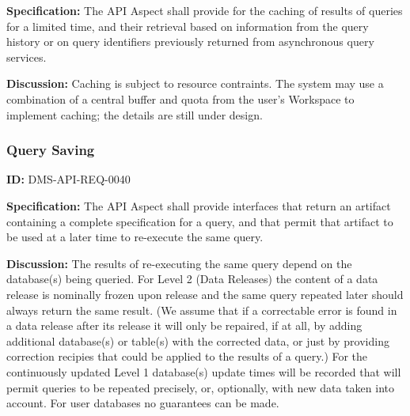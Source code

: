 \documentclass[SE,toc,lsstdraft]{lsstdoc}
\newcommand{\addendum}{}
\begin{document}
\textbf{Specification:}
The API Aspect shall provide for the caching of results of queries for a limited time, and their retrieval based on information from the query history or on query identifiers previously returned from asynchronous query services.

\textbf{Discussion:}
Caching is subject to resource contraints.  The system may use a combination of a central buffer and quota from the user's Workspace to implement caching; the details are still under design.

\subsubsection{Query Saving}

\label{DMS-API-REQ-0040}
\textbf{ID:} DMS-API-REQ-0040

\textbf{Specification:}
The API Aspect shall provide interfaces that return an artifact containing a complete specification for a query, and that permit that artifact to be used at a later time to re-execute the same query.

\textbf{Discussion:}
The results of re-executing the same query depend on the database(s) being queried.  For Level 2 (Data Releases) the content of a data release is nominally frozen upon release and the same query repeated later should always return the same result.  (We assume that if a correctable error is found in a data release after its release it will only be repaired, if at all, by adding additional database(s) or table(s) with the corrected data, or just by providing correction recipies that could be applied to the results of a query.)
For the continuously updated Level 1 database(s) update times will be recorded that will permit queries to be repeated precisely, or, optionally, with new data taken into account.
For user databases no guarantees can be made.

\addendum


\end{document}
